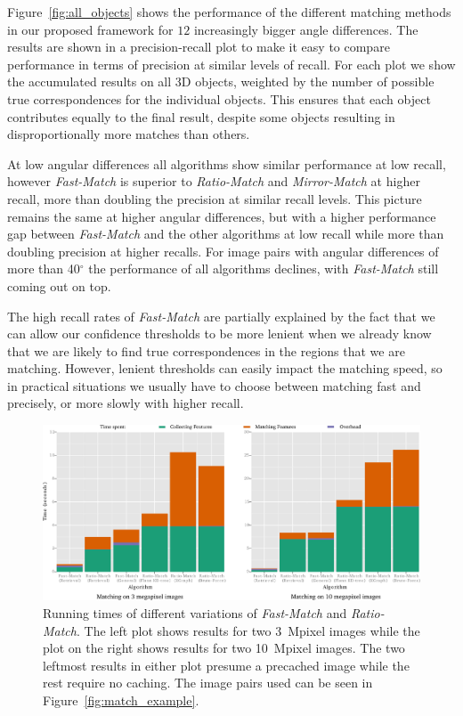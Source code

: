 \documentclass[runningheads]{llncs}
\begin{document}
Figure~\ref{fig:all_objects} shows the performance of the different matching methods in our proposed framework for $12$ increasingly bigger angle differences. The results are shown in a precision-recall plot to make it easy to compare performance in terms of precision at similar levels of recall.  For each plot we show the accumulated results on all 3D objects, weighted by the number of possible true correspondences for the individual objects. This ensures that each object contributes equally to the final result, despite some objects resulting in disproportionally more matches than others.

At low angular differences all algorithms show similar performance at low recall, however \emph{Fast-Match} is superior to \emph{Ratio-Match} and \emph{Mirror-Match} at higher recall, more than doubling the precision at similar recall levels. This picture remains the same at higher angular differences, but with a higher performance gap between \emph{Fast-Match} and the other algorithms at low recall while more than doubling precision at higher recalls. For image pairs with angular differences of more than 40$^{\circ}$ the performance of all algorithms declines, with \emph{Fast-Match} still coming out on top. 

The high recall rates of \emph{Fast-Match} are partially explained by the fact that we can allow our confidence thresholds to be more lenient when we already know that we are likely to find true correspondences in the regions that we are matching. However, lenient thresholds can easily impact the matching speed, so in practical situations we usually have to choose between matching fast and precisely, or more slowly with higher recall. 

\begin{figure}[tb]
    \centering
    \includegraphics[width=1\columnwidth]{images/timings}
    \caption{Running times of different variations of \emph{Fast-Match}
    and \emph{Ratio-Match}. The left plot shows results for two 3~Mpixel
    images while the plot on the right shows results for two 10~Mpixel
    images. The two leftmost results in either plot presume a precached
    image while the rest require no caching. The image
pairs used can be seen in Figure~\ref{fig:match_example}.}
    \label{fig:timings}
\end{figure}
\end{document}
